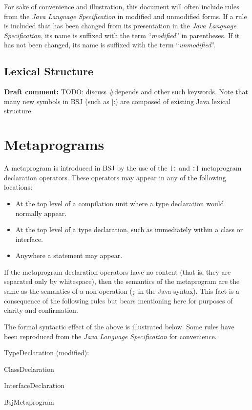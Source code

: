 \documentclass[a4paper,10pt]{report}
\newenvironment{draftcomment}{\vspace{0.5cm}\begin{itshape}\textbf{Draft comment: }}{\end{itshape}\vspace{0.5cm}}
\newcommand{\dc}[1]{\begin{draftcomment}#1\end{draftcomment}} %
\newcommand{\JLS}{\textit{Java Language Specification}}
\newenvironment{grammar}{
    \begin{list}{}{
        \itshape
        \setlength{\partopsep}{\topsep}
        \setlength{\topsep}{0cm}
    }
}{
    \end{list}
}
\begin{document}
For sake of convenience and illustration, this document will often include rules from the \JLS{} in modified and unmodified forms.  If a rule is included that has been changed from its presentation in the \JLS{}, its name is suffixed with the term ``\textit{modified}'' in parentheses.  If it has not been changed, its name is suffixed with the term ``\textit{unmodified}''.

\section{Lexical Structure}
\label{secGrammarLex}

\dc{TODO: discuss \#depends and other such keywords.  Note that many new symbols in BSJ (such as [:) are composed of existing Java lexical structure.}

\chapter{Metaprograms}
\label{secMetaprog}

A metaprogram is introduced in BSJ by the use of the \verb`[:` and \verb`:]` metaprogram declaration operators.  These operators may appear in any of the following locations:

\begin{itemize}
    \item At the top level of a compilation unit where a type declaration would normally appear.
    \item At the top level of a type declaration, such as immediately within a class or interface.
    \item Anywhere a statement may appear.
\end{itemize}

If the metaprogram declaration operators have no content (that is, they are separated only by whitespace), then the semantics of the metaprogram are the same as the semantics of a non-operation (\verb`;` in the Java syntax).  This fact is a consequence of the following rules but bears mentioning here for purposes of clarity and confirmation.

The formal syntactic effect of the above is illustrated below.  Some rules have been reproduced from the \JLS{} for convenience.

\begin{grammar}
    \item TypeDeclaration (modified):
    \begin{grammar}
        \item ClassDeclaration
        \item InterfaceDeclaration
        \item BsjMetaprogram
    \end{grammar}
\end{grammar}
\end{document}
